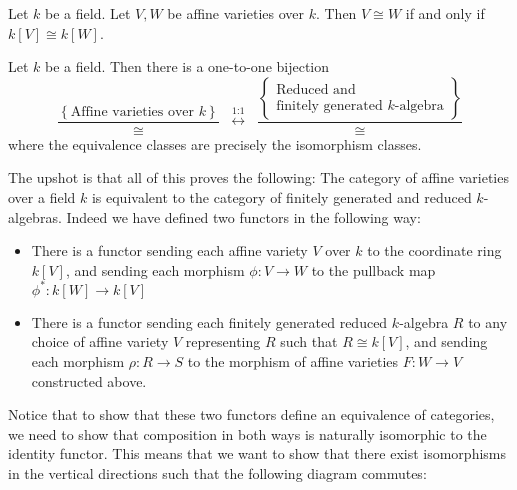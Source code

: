 \documentclass[a4paper]{article}
\begin{document}
\begin{prp}{}{} Let $k$ be a field. Let $V,W$ be affine varieties over $k$. Then $V\cong W$ if and only if $k[V]\cong k[W]$. 
\end{prp}

\begin{crl}{}{} Let $k$ be a field. Then there is a one-to-one bijection $$\frac{\left\{\text{Affine varieties over }k\right\}}{\cong}\;\;\overset{\text{1:1}}{\longleftrightarrow}\;\;\frac{\left\{\substack{\text{Reduced and }\\\text{finitely generated }k\text{-algebra}}\right\}}{\cong}$$ where the equivalence classes are precisely the isomorphism classes. 
\end{crl}

The upshot is that all of this proves the following: The category of affine varieties over a field $k$ is equivalent to the category of finitely generated and reduced $k$-algebras. Indeed we have defined two functors in the following way:
\begin{itemize}
\item There is a functor sending each affine variety $V$ over $k$ to the coordinate ring $k[V]$, and sending each morphism $\phi:V\to W$ to the pullback map $\phi^\ast:k[W]\to k[V]$
\item There is a functor sending each finitely generated reduced $k$-algebra $R$ to any choice of affine variety $V$ representing $R$ such that $R\cong k[V]$, and sending each morphism $\rho:R\to S$ to the morphism of affine varieties $F:W\to V$ constructed above. 
\end{itemize}

Notice that to show that these two functors define an equivalence of categories, we need to show that composition in both ways is naturally isomorphic to the identity functor. This means that we want to show that there exist isomorphisms in the vertical directions such that the following diagram commutes: \\~\\
 \\~\\
\end{document}
